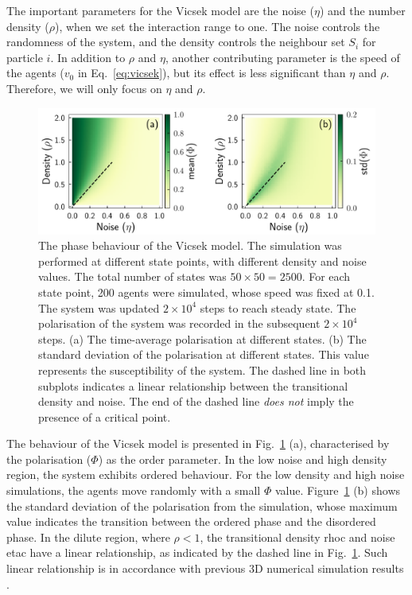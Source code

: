 \documentclass[11pt,twoside]{report}
\begin{document}
The important parameters for the Vicsek model are the noise ($\eta$) and the number density ($\rho$), when we set the interaction range to one. The noise controls the randomness of the system, and the density controls the neighbour set $S_{i}$ for particle $i$. In addition to $\rho$ and $\eta$, another contributing parameter is the speed of the agents ($v_0$ in Eq.~\ref{eq:vicsek}), but its effect is less significant than $\eta$ and $\rho$. Therefore, we will only focus on $\eta$ and $\rho$.


\begin{figure}
  \includegraphics[width=\linewidth]{phase-vicsek}
  \caption[The phase behaviour of the Vicsek model]{
  The phase behaviour of the Vicsek model. The simulation was performed at different state points, with different density and noise values. The total number of states was $50 \times 50 = 2500$. For each state point, 200 agents were simulated, whose speed was fixed at 0.1. The system was updated $2\times10^4$ steps to reach steady state. The polarisation of the system was recorded in the subsequent $2\times10^4$ steps.
  (a) The time-average polarisation at different states.
  (b) The standard deviation of the polarisation at different states. This value represents the susceptibility of the system.
  The dashed line in both subplots indicates a linear relationship between the transitional density and noise. The end of the dashed line \emph{does not} imply the presence of a critical point.
  }
  \label{fig:phase-vicsek}
\end{figure}

The behaviour of the Vicsek model is presented in Fig.~\ref{fig:phase-vicsek} (a), characterised by the polarisation ($\Phi$) as the order parameter. In the low noise and high density region, the system exhibits ordered behaviour. For the low density and high noise simulations, the agents move randomly with a small $\Phi$ value. Figure~\ref{fig:phase-vicsek} (b) shows the standard deviation of the polarisation from the simulation, whose maximum value indicates the transition between the ordered phase and the disordered phase. In the dilute region, where $\rho < 1$, the transitional density \gls{rhoc} and noise \gls{etac} have a linear relationship, as indicated by the dashed line in Fig.~\ref{fig:phase-vicsek}. Such linear relationship is in accordance with previous 3D numerical simulation results \cite{puzzo2019}.
\end{document}
